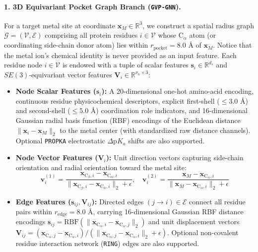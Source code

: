 \documentclass[10pt,a4paper,twocolumn]{article}
\begin{document}
\paragraph{1. 3D Equivariant Pocket Graph Branch (\texttt{GVP-GNN}).}
For a target metal site at coordinate $\mathbf{x}_M \in \mathbb{R}^3$, we construct a spatial radius graph $\mathcal{G} = (\mathcal{V}, \mathcal{E})$ comprising all protein residues $i \in \mathcal{V}$ whose $\text{C}_\alpha$ atom (or coordinating side-chain donor atom) lies within $r_{\text{pocket}} = 8.0\text{ \AA}$ of $\mathbf{x}_M$. Notice that the metal ion's chemical identity is never provided as an input feature. Each residue node $i \in \mathcal{V}$ is endowed with a tuple of scalar features $\mathbf{s}_i \in \mathbb{R}^{d_s}$ and $SE(3)$-equivariant vector features $\mathbf{V}_i \in \mathbb{R}^{\nu_n \times 3}$:
\begin{itemize}
  \item \textbf{Node Scalar Features ($\mathbf{s}_i$):} A 20-dimensional one-hot amino-acid encoding, continuous residue physicochemical descriptors, explicit first-shell ($\le 3.0\text{ \AA}$) and second-shell ($\le 5.0\text{ \AA}$) coordination role indicators, and 16-dimensional Gaussian radial basis function (RBF) encodings of the Euclidean distance $\|\mathbf{x}_i - \mathbf{x}_M\|_2$ to the metal center (with standardized raw distance channels). Optional \texttt{PROPKA} electrostatic $\Delta\text{p}K_a$ shifts \cite{olsson2011propka3} are also supported.
  \item \textbf{Node Vector Features ($\mathbf{V}_i$):} Unit direction vectors capturing side-chain orientation and radial orientation toward the metal site:
  \begin{equation}
    \mathbf{v}_i^{(1)} = \frac{\mathbf{x}_{\text{C}_\beta, i} - \mathbf{x}_{\text{C}_\alpha, i}}{\|\mathbf{x}_{\text{C}_\beta, i} - \mathbf{x}_{\text{C}_\alpha, i}\|_2 + \epsilon}, \quad
    \mathbf{v}_i^{(2)} = \frac{\mathbf{x}_M - \mathbf{x}_{\text{C}_\alpha, i}}{\|\mathbf{x}_M - \mathbf{x}_{\text{C}_\alpha, i}\|_2 + \epsilon}
  \end{equation}
  \item \textbf{Edge Features ($\mathbf{s}_{ij}, \mathbf{V}_{ij}$):} Directed edges $(j \to i) \in \mathcal{E}$ connect all residue pairs within $r_{\text{edge}} = 8.0\text{ \AA}$, carrying 16-dimensional Gaussian RBF distance encodings $\mathbf{s}_{ij} = \text{RBF}(\|\mathbf{x}_{\text{C}_\alpha, i} - \mathbf{x}_{\text{C}_\alpha, j}\|_2)$ and unit displacement vectors $\mathbf{V}_{ij} = (\mathbf{x}_{\text{C}_\alpha, j} - \mathbf{x}_{\text{C}_\alpha, i}) / (\|\mathbf{x}_{\text{C}_\alpha, j} - \mathbf{x}_{\text{C}_\alpha, i}\|_2 + \epsilon)$. Optional non-covalent residue interaction network (\texttt{RING}) edges \cite{clementel2022ring3} are also supported.
\end{itemize}
\end{document}
